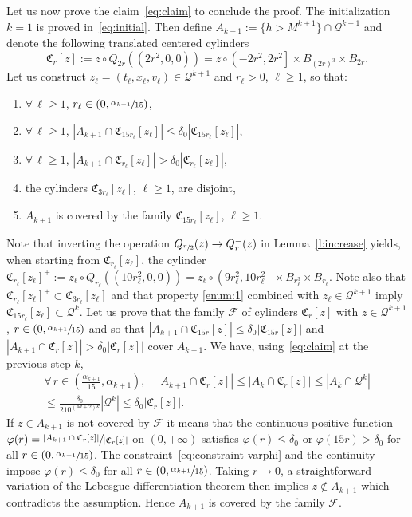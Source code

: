 \documentclass[11pt]{article}
\numberwithin{equation}{section}\let\oldbigcup\bigcup
\let\mathcal\mathscr
\theoremstyle{definition}
\theoremstyle{remark}
\newcommand{\cQ}{\mathcal Q}
\begin{document}
Let us now prove the claim~\eqref{eq:claim} to conclude the
proof. The initialization $k=1$ is proved
in~\eqref{eq:initial}. Then define
$A_{k+1} := \{ h > M^{k+1} \} \cap \cQ^{k+1}$ and denote
the following translated centered cylinders
\[
\mathfrak C_{r}[z] :=z\circ Q_{2r}((2r^2,0,0))= z \circ
\left(-2r^2,2r^2\right]\times B_{(2r)^3} \times B_{2r}.
\]
Let us
construct $z_\ell=(t_\ell,x_\ell,v_\ell)\in \cQ^{k+1}$ and
$r_\ell >0$, $\ell \ge 1$, so that:
\begin{enumerate}
\item\label{enum:1} $\forall \, \ell \ge 1$, $r_\ell \in (0,\sfrac{\alpha_{k+1}}{15})$,
\item\label{enum:2} $\forall \, \ell \ge 1$,
$|A_{k+1} \cap \mathfrak C_{15r_\ell}[z_\ell]| \le \delta_0
|\mathfrak C_{15 r_\ell}[z_\ell]|$,
\item\label{enum:3} $\forall \, \ell \ge 1$,
$|A_{k+1} \cap \mathfrak C_{r_\ell}[z_\ell]| > \delta_0
|\mathfrak C_{r_\ell}[z_\ell]|$,
\item\label{enum:4} the cylinders $\mathfrak C_{3r_\ell}[z_\ell]$, $\ell \ge
1$, are disjoint,
\item\label{enum:5} $A_{k+1}$ is covered by the family $\mathfrak
C_{15r_\ell}[z_\ell]$, $\ell \ge 1$.
\end{enumerate}
Note that inverting the operation
$Q_{\sfrac{r}{2}}(z) \to Q_{r}^-(z)$ in Lemma~\ref{l:increase}
yields, when starting from $\mathfrak C_{r_\ell}[z_\ell]$, the
cylinder
$\mathfrak C_{r_\ell}[z_\ell]^+ :=z_\ell\circ
Q_{r_\ell}((10r_\ell^2,0,0))= z_\ell \circ
\left(9r_\ell^2,10r_\ell^2\right]\times B_{r_\ell^3} \times
B_{r_\ell}$. Note also that
$\mathfrak C_{r_\ell}[z_\ell]^+ \subset \mathfrak C_{3
r_\ell}[z_\ell]$ and that property \eqref{enum:1} combined with
$z_\ell \in \cQ^{k+1}$ imply
$\mathfrak C_{15r_\ell}[z_\ell] \subset \cQ^k$. Let us prove
that the family $\mathcal F$ of cylinders $\mathfrak C_{r}[z]$
with $z \in \cQ^{k+1}$, $r \in (0,\sfrac{\alpha_{k+1}}{15})$ and
so that
$|A_{k+1} \cap \mathfrak C_{15r}[z]| \le \delta_0 |\mathfrak
C_{15 r}[z]|$ and
$|A_{k+1} \cap \mathfrak C_{r}[z]| > \delta_0 |\mathfrak
C_{r}[z]|$ cover $A_{k+1}$. We have, using~\eqref{eq:claim} at
the previous step $k$,
\begin{multline}
\label{eq:constraint-varphi}
\forall \, r \in
\left(\frac{\alpha_{k+1}}{15},\alpha_{k+1}\right), \quad
|A_{k+1} \cap \mathfrak C_{r}[z]| \le |A_{k} \cap \mathfrak
C_{r}[z]| \le |A_{k} \cap \cQ^k| \\
\le \frac{\delta_0}{210^{(4d+2)k}} |\cQ^k| \le \delta_0
|\mathfrak C_{r}[z]|.
\end{multline}
If $z \in A_{k+1}$ is not covered by $\mathcal F$ it means that
the continuous positive function
$\varphi(r) = \sfrac{|A_{k+1} \cap \mathfrak C_{r}[z]|}{|\mathfrak
C_{r}[z]|}$ on $(0,+\infty)$ satisfies $\varphi(r) \le \delta_0$
or $\varphi(15r) > \delta_0$ for all
$r \in (0,\sfrac{\alpha_{k+1}}{15})$. The
constraint~\eqref{eq:constraint-varphi} and the continuity impose
$\varphi(r) \le \delta_0$ for all
$r \in\nobreak (0,\sfrac{\alpha_{k+1}}{15})$. Taking $r \to 0$, a
straightforward variation of the Lebesgue differentiation theorem
then implies $z\notin A_{k+1}$ which contradicts the
assumption. Hence $A_{k+1}$ is covered by the family $\mathcal
F$.
\end{document}
